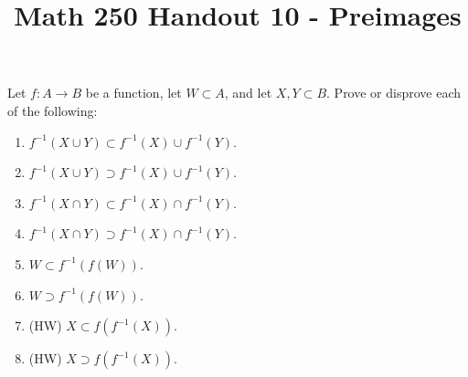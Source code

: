 \documentclass[12pt, reqno]{amsart}
\begin{document}
\title[Math 250 Handout 10 - Preimages]{Math 250 Handout 10  - Preimages}\maketitle


  Let $f\colon A \to B$ be a function, let $W \subset A$, and let $X,Y \subset B$. Prove
  or disprove each of the following:  
\begin{enumerate}
  \item $f^{-1}(X \cup Y) \subset f^{-1}(X) \cup f^{-1}(Y)$.
  \item $f^{-1}(X \cup Y) \supset f^{-1}(X) \cup f^{-1}(Y)$.
  \item $f^{-1}(X \cap Y) \subset f^{-1}(X) \cap f^{-1}(Y)$.
  \item $f^{-1}(X \cap Y) \supset f^{-1}(X) \cap f^{-1}(Y)$.
  \item $W \subset f^{-1}(f(W))$.
  \item $W \supset f^{-1}(f(W))$.
  \item (HW) $X \subset f(f^{-1}(X))$.
  \item (HW) $X \supset f(f^{-1}(X))$.
\end{enumerate}  
\end{document}
